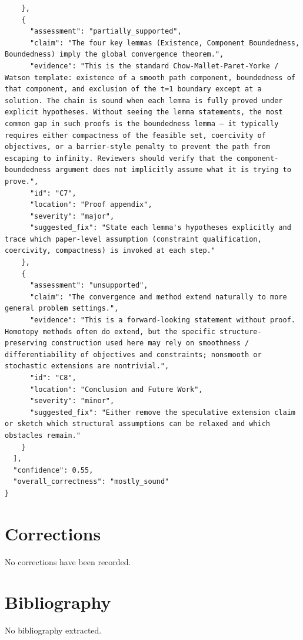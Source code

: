 \documentclass[11pt]{article}
\begin{document}
\begin{verbatim}
    },
    {
      "assessment": "partially_supported",
      "claim": "The four key lemmas (Existence, Component Boundedness, Boundedness) imply the global convergence theorem.",
      "evidence": "This is the standard Chow-Mallet-Paret-Yorke / Watson template: existence of a smooth path component, boundedness of that component, and exclusion of the t=1 boundary except at a solution. The chain is sound when each lemma is fully proved under explicit hypotheses. Without seeing the lemma statements, the most common gap in such proofs is the boundedness lemma — it typically requires either compactness of the feasible set, coercivity of objectives, or a barrier-style penalty to prevent the path from escaping to infinity. Reviewers should verify that the component-boundedness argument does not implicitly assume what it is trying to prove.",
      "id": "C7",
      "location": "Proof appendix",
      "severity": "major",
      "suggested_fix": "State each lemma's hypotheses explicitly and trace which paper-level assumption (constraint qualification, coercivity, compactness) is invoked at each step."
    },
    {
      "assessment": "unsupported",
      "claim": "The convergence and method extend naturally to more general problem settings.",
      "evidence": "This is a forward-looking statement without proof. Homotopy methods often do extend, but the specific structure-preserving construction used here may rely on smoothness / differentiability of objectives and constraints; nonsmooth or stochastic extensions are nontrivial.",
      "id": "C8",
      "location": "Conclusion and Future Work",
      "severity": "minor",
      "suggested_fix": "Either remove the speculative extension claim or sketch which structural assumptions can be relaxed and which obstacles remain."
    }
  ],
  "confidence": 0.55,
  "overall_correctness": "mostly_sound"
}
\end{verbatim}

\section*{Corrections}
No corrections have been recorded.

\section*{Bibliography}
No bibliography extracted.

% 
% 
\end{document}
